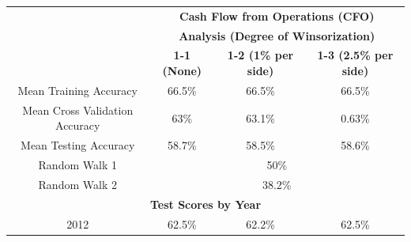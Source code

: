 {{\begin{table}[]
\centering
\begin{tabular}{cccc}
\textbf{}                                            & \multicolumn{3}{c}{\textbf{Cash Flow from Operations (CFO)}}                                                                                             \\ \cline{2-4} 
\multicolumn{1}{c|}{}                                & \multicolumn{3}{c|}{\textbf{Analysis (Degree of Winsorization)}}                                                                                         \\ \cline{2-4} 
\multicolumn{1}{c|}{}                                & \multicolumn{1}{c|}{\textbf{1-1 (None)}} & \multicolumn{1}{c|}{\textbf{1-2 (1\% per side)}} & \multicolumn{1}{c|}{\textbf{1-3 (2.5\% per side)}} \\ \hline
\multicolumn{1}{|c|}{Mean Training Accuracy}         & \multicolumn{1}{c|}{66.5\%}                      & \multicolumn{1}{c|}{66.5\%}                      & \multicolumn{1}{c|}{66.5\%}                        \\ \hline
\multicolumn{1}{|c|}{Mean Cross Validation Accuracy} & \multicolumn{1}{c|}{63\%}                        & \multicolumn{1}{c|}{63.1\%}                      & \multicolumn{1}{c|}{0.63\%}                        \\ \hline
\multicolumn{1}{|c|}{Mean Testing Accuracy}          & \multicolumn{1}{c|}{58.7\%}                      & \multicolumn{1}{c|}{58.5\%}                      & \multicolumn{1}{c|}{58.6\%}                        \\ \hline
\multicolumn{1}{|c|}{Random Walk 1}                  & \multicolumn{3}{c|}{50\%}                                                                                                                                \\ \hline
\multicolumn{1}{|c|}{Random Walk 2}                  & \multicolumn{3}{c|}{38.2\%}                                                                                                                              \\ \hline
\multicolumn{4}{|c|}{\textbf{Test Scores by Year}}                                                                                                                                                              \\ \hline
\multicolumn{1}{|c|}{2012}                           & \multicolumn{1}{c|}{62.5\%}                      & \multicolumn{1}{c|}{62.2\%}                      & \multicolumn{1}{c|}{62.5\%}                        \\ \hline

\end{tabular}
\end{table}}}
